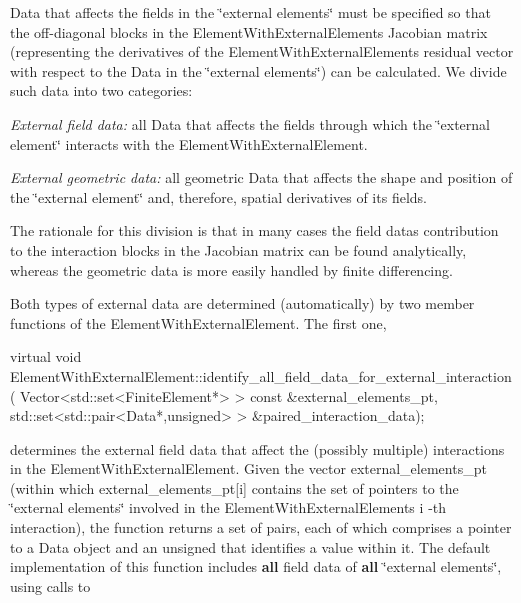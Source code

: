 {\ttfamily Data} that affects the fields in the \char`\"{}external elements\char`\"{} must be specified so that the off-\/diagonal blocks in the {\ttfamily Element\+With\+External\+Element\textquotesingle{}s} Jacobian matrix (representing the derivatives of the {\ttfamily Element\+With\+External\+Element\textquotesingle{}s} residual vector with respect to the {\ttfamily Data} in the \char`\"{}external elements\char`\"{}) can be calculated. We divide such data into two categories\+:
\begin{DoxyItemize}
\item {\itshape  External field data\+: } all {\ttfamily Data} that affects the fields through which the \char`\"{}external element\char`\"{} interacts with the {\ttfamily Element\+With\+External\+Element}.
\end{DoxyItemize}
\begin{DoxyItemize}
\item {\itshape  External geometric data\+: } all geometric {\ttfamily Data} that affects the shape and position of the \char`\"{}external element\char`\"{} and, therefore, spatial derivatives of its fields.
\end{DoxyItemize}The rationale for this division is that in many cases the field data\textquotesingle{}s contribution to the interaction blocks in the Jacobian matrix can be found analytically, whereas the geometric data is more easily handled by finite differencing.

Both types of external data are determined (automatically) by two member functions of the {\ttfamily Element\+With\+External\+Element}. The first one,


\begin{DoxyCode}
\textcolor{keyword}{virtual} \textcolor{keywordtype}{void}  ElementWithExternalElement::identify\_all\_field\_data\_for\_external\_interaction(
    Vector<std::set<FiniteElement*> > \textcolor{keyword}{const} &external\_elements\_pt,
    std::set<std::pair<Data*,unsigned> > &paired\_interaction\_data); 
\end{DoxyCode}


determines the external field data that affect the (possibly multiple) interactions in the {\ttfamily Element\+With\+External\+Element}. Given the vector {\ttfamily external\+\_\+elements\+\_\+pt} (within which {\ttfamily  external\+\_\+elements\+\_\+pt\mbox{[}i\mbox{]} } contains the set of pointers to the \char`\"{}external elements\char`\"{} involved in the {\ttfamily Element\+With\+External\+Element\textquotesingle{}s} {\ttfamily i} -\/th interaction), the function returns a set of pairs, each of which comprises a pointer to a {\ttfamily Data} object and an unsigned that identifies a value within it. The default implementation of this function includes {\bfseries all} field data of {\bfseries all} \char`\"{}external elements\char`\"{}, using calls to


